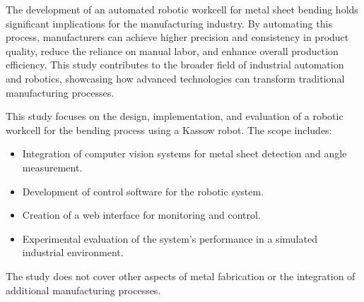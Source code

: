 The development of an automated robotic workcell for metal sheet bending holds significant implications for the manufacturing industry. By automating this process, manufacturers can achieve higher precision and consistency in product quality, reduce the reliance on manual labor, and enhance overall production efficiency. This study contributes to the broader field of industrial automation and robotics, showcasing how advanced technologies can transform traditional manufacturing processes.

This study focuses on the design, implementation, and evaluation of a robotic workcell for the bending process using a Kassow robot. The scope includes:
\begin{itemize}
    \item Integration of computer vision systems for metal sheet detection and angle measurement.
    \item Development of control software for the robotic system.
    \item Creation of a web interface for monitoring and control.
    \item Experimental evaluation of the system's performance in a simulated industrial environment.
\end{itemize}

The study does not cover other aspects of metal fabrication or the integration of additional manufacturing processes.
